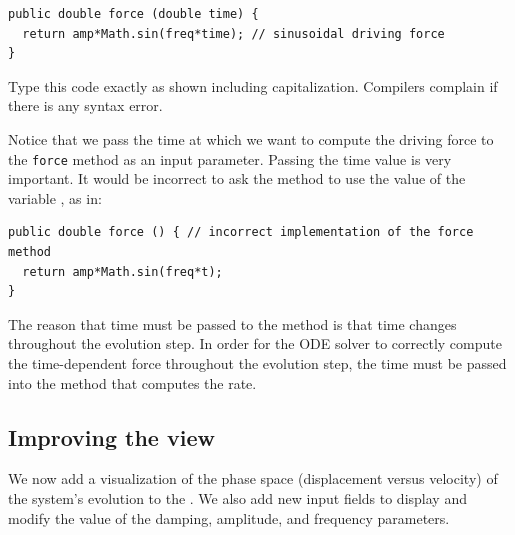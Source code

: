 \begin{listing}
\begin{verbatim}
public double force (double time) {
  return amp*Math.sin(freq*time); // sinusoidal driving force
}
\end{verbatim}
\end{listing}
Type this code exactly as shown including capitalization. Compilers complain if there is any syntax error.

Notice that we pass the time at which we want to compute the driving force to the \texttt{force} method as an input parameter. Passing
the time value is very important. It would be incorrect to ask the method to use the value of the variable , as
in:

\begin{listing}
\begin{verbatim}
public double force () { // incorrect implementation of the force method
  return amp*Math.sin(freq*t);
}
\end{verbatim}
\end{listing}

\noindent The reason that time must be passed to the method is that time changes throughout the evolution step.  In order for the ODE solver to correctly compute the time-dependent force throughout the evolution step, the time must be passed into the method that computes the rate.


\subsection{Improving the view}\label{section:02ExplorationJavaModifyingView}
We now add a visualization of the phase space (displacement versus velocity) of the system's evolution to the
. We also add new input fields to display and modify the value of the damping, amplitude, and frequency parameters.

